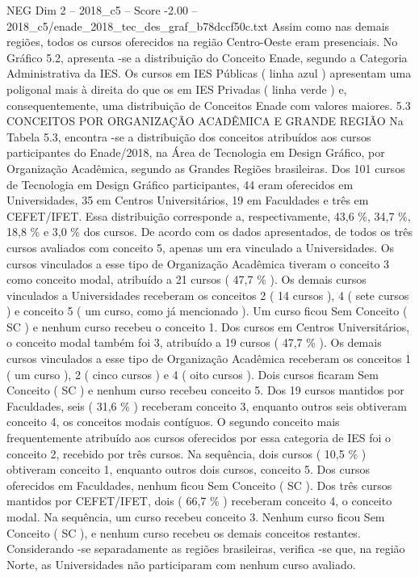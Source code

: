 \begin{textsample}{NEG Dim 2 – 2018\_c5 – Score -2.00 – 2018\_c5/enade\_2018\_tec\_des\_graf\_b78dccf50c.txt}
Assim como nas demais regiões, todos os cursos oferecidos na região Centro-Oeste eram presenciais.
No Gráfico 5.2, apresenta -se a distribuição do Conceito Enade, segundo a Categoria Administrativa da IES.
Os cursos em IES Públicas ( linha azul ) apresentam uma poligonal mais à direita do que os em IES Privadas ( linha verde ) e, consequentemente, uma distribuição de Conceitos Enade com valores maiores. 5.3 CONCEITOS POR ORGANIZAÇÃO ACADÊMICA E GRANDE REGIÃO Na Tabela 5.3, encontra -se a distribuição dos conceitos atribuídos aos cursos participantes do Enade/2018, na Área de Tecnologia em Design Gráfico, por Organização Acadêmica, segundo as Grandes Regiões brasileiras.
Dos 101 cursos de Tecnologia em Design Gráfico participantes, 44 eram oferecidos em Universidades, 35 em Centros Universitários, 19 em Faculdades e três em CEFET/IFET.
Essa distribuição corresponde a, respectivamente, 43,6 \%, 34,7 \%, 18,8 \% e 3,0 \% dos cursos.
De acordo com os dados apresentados, de todos os três cursos avaliados com conceito 5, apenas um era vinculado a Universidades.
Os cursos vinculados a esse tipo de Organização Acadêmica tiveram o conceito 3 como conceito modal, atribuído a 21 cursos ( 47,7 \% ).
Os demais cursos vinculados a Universidades receberam os conceitos 2 ( 14 cursos ), 4 ( sete cursos ) e conceito 5 ( um curso, como já mencionado ).
Um curso ficou Sem Conceito ( SC ) e nenhum curso recebeu o conceito 1.
Dos cursos em Centros Universitários, o conceito modal também foi 3, atribuído a 19 cursos ( 47,7 \% ).
Os demais cursos vinculados a esse tipo de Organização Acadêmica receberam os conceitos 1 ( um curso ), 2 ( cinco cursos ) e 4 ( oito cursos ).
Dois cursos ficaram Sem Conceito ( SC ) e nenhum curso recebeu conceito 5.
Dos 19 cursos mantidos por Faculdades, seis ( 31,6 \% ) receberam conceito 3, enquanto outros seis obtiveram conceito 4, os conceitos modais contíguos.
O segundo conceito mais frequentemente atribuído aos cursos oferecidos por essa categoria de IES foi o conceito 2, recebido por três cursos.
Na sequência, dois cursos ( 10,5 \% ) obtiveram conceito 1, enquanto outros dois cursos, conceito 5.
Dos cursos oferecidos em Faculdades, nenhum ficou Sem Conceito ( SC ).
Dos três cursos mantidos por CEFET/IFET, dois ( 66,7 \% ) receberam conceito 4, o conceito modal.
Na sequência, um curso recebeu conceito 3.
Nenhum curso ficou Sem Conceito ( SC ), e nenhum curso recebeu os demais conceitos restantes.
Considerando -se separadamente as regiões brasileiras, verifica -se que, na região Norte, as Universidades não participaram com nenhum curso avaliado.

\end{textsample}
